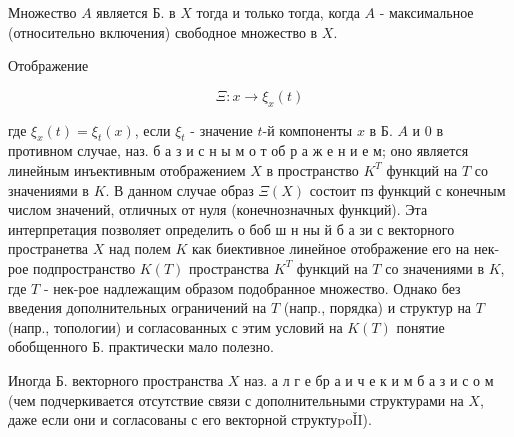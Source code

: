 \documentclass[10pt]{article}
\begin{document}
Множество $A$ является Б. в $X$ тогда и только тогда, когда $A$ - максимальное (относительно включения) свободное множество в $X$.



Отображение



\[

\Xi: x \longrightarrow \xi_{x}(t)

\]



где $\xi_{x}(t)=\xi_{t}(x)$, если $\xi_{t}$ - значение $t$-й компоненты $x$ в Б. $A$ и 0 в противном случае, наз. б а з и с н ы м о т об р а ж е н и е м; оно является линейным инъективным отображением $X$ в пространство $K^{T}$ функций на $T$ со значениями в $K$. В данном случае образ $\Xi(X)$ состоит пз функций с конечным числом значений, отличных от нуля (конечнозначных функций). Эта интерпретация позволяет определить о боб ш н ны й б а зи с векторного пространетва $X$ над полем $K$ как биективное линейное отображение его на нек-рое подпространство $K(T)$ пространства $K^{T}$ функций на $T$ со значениями в $K$, где $T$ - нек-рое надлежащим образом подобранное множество. Однако без введения дополнительных ограничений на $T$ (напр., порядка) и структур на $T$ (напр., топологии) и согласованных с этим условий на $K(T)$ понятие обобщенного Б. практически мало полезно.



Иногда Б. векторного пространства $X$ наз. а л г е бр а и ч е к и м б а з и с о м (чем подчеркивается отсутствие связи с дополнительными структурами на $X$, даже если они и согласованы с его векторной структуpoǏI).
\end{document}
